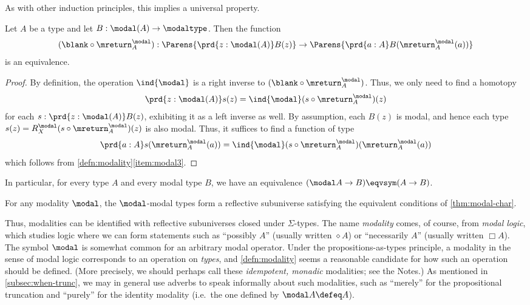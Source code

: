 %
As with other induction principles, this implies a universal property.

\begin{thm}\label{prop:lv_n_deptype_sec_equiv_by_precomp}
Let $A$ be a type and let $B:\modal(A)\to\modaltype$. Then the function
\begin{equation*}
(\blank\circ \mreturn^\modal_A) : \Parens{\prd{z:\modal(A)}B(z)} \to \Parens{\prd{a:A}B(\mreturn^\modal_A(a))}
\end{equation*}
is an equivalence.
\end{thm}
\begin{proof}
By definition, the operation $\ind{\modal}$ is a right inverse to $(\blank\circ \mreturn^\modal_A)$.
Thus, we only need to find a homotopy
\begin{equation*}
\prd{z:\modal(A)}s(z)= \ind{\modal}(s\circ \mreturn^\modal_A)(z)
\end{equation*}
for each $s:\prd{z:\modal(A)}B(z)$, exhibiting it as a left inverse as well.
By assumption, each $B(z)$ is modal, and hence each type $s(z)= R^\modal_X(s\circ \mreturn^\modal_A)(z)$
is also modal.
Thus, it suffices to find a function of type
\begin{equation*}
\prd{a:A}s(\mreturn^\modal_A(a))= \ind{\modal}(s\circ \mreturn^\modal_A)(\mreturn^\modal_A(a))
\end{equation*}
which follows from \cref{defn:modality}\ref{item:modal3}.
\end{proof}

In particular, for every type $A$ and every modal type $B$, we have an equivalence $(\modal A\to B)\eqvsym (A\to B)$.

\begin{cor}
  For any modality $\modal$, the $\modal$-modal types form a reflective subuniverse satisfying the equivalent conditions of \cref{thm:modal-char}.
\end{cor}

Thus, modalities can be identified with reflective subuniverses closed under $\Sigma$-types.
The name \emph{modality} comes, of course, from \emph{modal logic}, which studies logic where we can form statements such as ``possibly $A$'' (usually written $\diamond A$) or ``necessarily $A$'' (usually written $\Box A$).
The symbol $\modal$ is somewhat common for an arbitrary modal operator. %
Under the propositions-as-types principle, a modality in the sense of modal logic corresponds to an operation on \emph{types}, and \cref{defn:modality} seems a reasonable candidate for how such an operation should be defined.
(More precisely, we should perhaps call these \emph{idempotent, monadic} modalities; see the Notes.)
%
As mentioned in \cref{subsec:when-trunc}, we may in general use adverbs to speak informally about such modalities, such as ``merely'' for the propositional truncation and ``purely'' for the identity modality
%
%
(i.e.\ the one defined by $\modal A \defeq A$).

